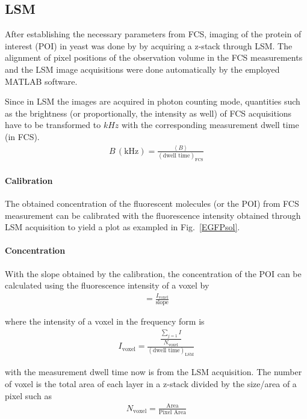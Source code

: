 \subsection{LSM}

After establishing the necessary parameters from FCS, imaging of the protein of interest (POI) in yeast was done by by acquiring a z-stack through LSM. 
The alignment of pixel positions of the observation volume in the FCS measurements and the LSM image acquisitions were done automatically by the employed MATLAB software. 

Since in LSM the images are acquired in photon counting mode, quantities such as the brightness (or proportionally, the intensity as well) of FCS acquisitions have to be transformed to $kHz$ with the corresponding measurement dwell time (in FCS).
\begin{align} 
B\,(\text{kHz}) = \frac{\left\langle B\right\rangle }{(\text{dwell time})_{\text{FCS}}}
\end{align}

\paragraph{Calibration} 
The obtained concentration of the fluorescent molecules (or the POI) from FCS measurement can be calibrated with the fluorescence intensity obtained through LSM acquisition to yield a plot as exampled in Fig.~\ref{EGFPsol}.  

\paragraph{Concentration}
With the slope obtained by the calibration, the concentration of the POI can be calculated using the fluorescence intensity of a voxel by
\begin{align} 
[C] = \frac{I_{\text{voxel}}}{\text{slope}}
\end{align}

where the intensity of a voxel in the frequency form is
\begin{align} 
I_{\text{voxel}} = \frac{\dfrac{\sum_{j=1}^{} I}{N_{\text{voxel}}}}{(\text{dwell time})_{\text{LSM}}} 
\end{align}

with the measurement dwell time now is from the LSM acquisition. The number of voxel is the total area of each layer in a z-stack divided by the size/area of a pixel such as
\begin{align} 
N_{\text{voxel}} = \frac{\text{Area}}{\text{Pixel Area}}
\end{align}

